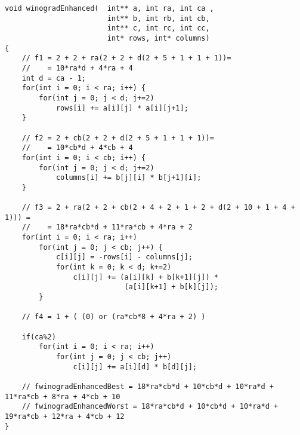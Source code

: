 \begin{lstlisting}[style=CStyle, caption={Winograd enhanced algorithm},
                    label={list:winogradEnh}]
void winogradEnhanced(  int** a, int ra, int ca , 
                        int** b, int rb, int cb, 
                        int** c, int rc, int cc,
                        int* rows, int* columns)
{
    // f1 = 2 + 2 + ra(2 + 2 + d(2 + 5 + 1 + 1 + 1))=
    //    = 10*ra*d + 4*ra + 4
    int d = ca - 1;
    for(int i = 0; i < ra; i++) {
        for(int j = 0; j < d; j+=2)
            rows[i] += a[i][j] * a[i][j+1];
    }

    // f2 = 2 + cb(2 + 2 + d(2 + 5 + 1 + 1 + 1))=
    //    = 10*cb*d + 4*cb + 4
    for(int i = 0; i < cb; i++) {
        for(int j = 0; j < d; j+=2)
            columns[i] += b[j][i] * b[j+1][i];
    }

    // f3 = 2 + ra(2 + 2 + cb(2 + 4 + 2 + 1 + 2 + d(2 + 10 + 1 + 4 + 1))) =
    //    = 18*ra*cb*d + 11*ra*cb + 4*ra + 2
    for(int i = 0; i < ra; i++)
        for(int j = 0; j < cb; j++) {
            c[i][j] = -rows[i] - columns[j];
            for(int k = 0; k < d; k+=2)
                c[i][j] += (a[i][k] + b[k+1][j]) * 
                            (a[i][k+1] + b[k][j]);
        }

    // f4 = 1 + ( (0) or (ra*cb*8 + 4*ra + 2) )

    if(ca%2)
        for(int i = 0; i < ra; i++)
            for(int j = 0; j < cb; j++)
                c[i][j] += a[i][d] * b[d][j];

    // fwinogradEnhancedBest = 18*ra*cb*d + 10*cb*d + 10*ra*d + 11*ra*cb + 8*ra + 4*cb + 10
    // fwinogradEnhancedWorst = 18*ra*cb*d + 10*cb*d + 10*ra*d + 19*ra*cb + 12*ra + 4*cb + 12
}
\end{lstlisting}
